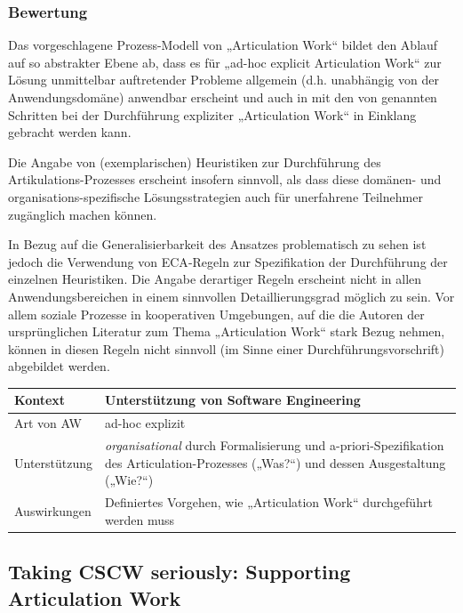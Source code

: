 \subsubsection{Bewertung}

Das vorgeschlagene Prozess-Modell von „Articulation Work“ bildet den Ablauf auf so abstrakter Ebene ab, dass es für „ad-hoc explicit Articulation Work“ zur Lösung unmittelbar auftretender Probleme allgemein (d.h. unabhängig von der Anwendungsdomäne) anwendbar erscheint und auch in mit den von \cite{Corbin93} genannten Schritten bei der Durchführung expliziter „Articulation Work“ in Einklang gebracht werden kann.

Die Angabe von (exemplarischen) Heuristiken zur Durchführung des Artikulations-Prozesses erscheint insofern sinnvoll, als dass diese domänen- und organisations-spezifische Lösungsstrategien auch für unerfahrene Teilnehmer zugänglich machen können.

In Bezug auf die Generalisierbarkeit des Ansatzes problematisch zu sehen ist jedoch die Verwendung von \gls{ECA}-Regeln zur Spezifikation der Durchführung der einzelnen Heuristiken. Die Angabe derartiger Regeln erscheint nicht in allen Anwendungsbereichen in einem sinnvollen Detaillierungsgrad möglich zu sein. Vor allem soziale Prozesse in kooperativen Umgebungen, auf die die Autoren der ursprünglichen Literatur zum Thema „Articulation Work“ stark Bezug nehmen, können in diesen Regeln nicht sinnvoll (im Sinne einer Durchführungsvorschrift) abgebildet werden.
\\[1em]
\begin{tabular}{| p{3cm} | p{10cm} |}
  \hline
  Kontext & Unterstützung von Software Engineering \\ \hline
  Art von AW & ad-hoc explizit \\ \hline
  Unterstützung & \emph{organisational} durch Formalisierung und a-priori-Spezifikation des Articulation-Prozesses („Was?“) und dessen Ausgestaltung („Wie?“) \\ \hline
  Auswirkungen & Definiertes Vorgehen, wie „Articulation Work“ durchgeführt werden muss \\ \hline
\end{tabular}


\subsection{Taking CSCW seriously: Supporting Articulation Work}

